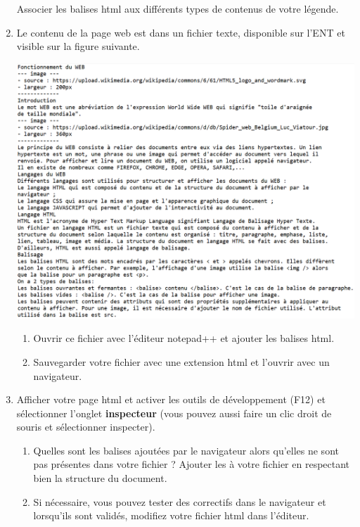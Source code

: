 \documentclass[11pt,a4paper]{article}
\newcounter{num}
\begin{document}
\begin{enumerate}
\begin{center}
\end{center}
Associer les balises html aux différents types de contenus de votre légende.

\newpage
\item Le contenu de la page web est dans un fichier texte, disponible sur l'ENT et visible sur la figure suivante.

\begin{center}
\includegraphics[scale=0.58]{img/langage_html_txt.png}
\end{center}

\begin{enumerate}
\item Ouvrir ce fichier avec l'éditeur \textsf{notepad++} et ajouter les balises html.
\item Sauvegarder votre fichier avec une extension \textsf{html} et l'ouvrir avec un navigateur.
\end{enumerate}

\item Afficher votre page html et activer les outils de développement (F12) et sélectionner l'onglet \textbf{inspecteur} (vous pouvez aussi faire un clic droit de souris et sélectionner \textsf{inspecter}).
\begin{enumerate}
\item Quelles sont les balises ajoutées par le navigateur alors qu'elles ne sont pas présentes dans votre fichier ? Ajouter les à votre fichier en respectant bien la structure du document.
\item Si nécessaire, vous pouvez tester des correctifs dans le navigateur et lorsqu'ils sont validés, modifiez votre fichier html dans l'éditeur.
\end{enumerate}


\end{enumerate}
\end{document}
